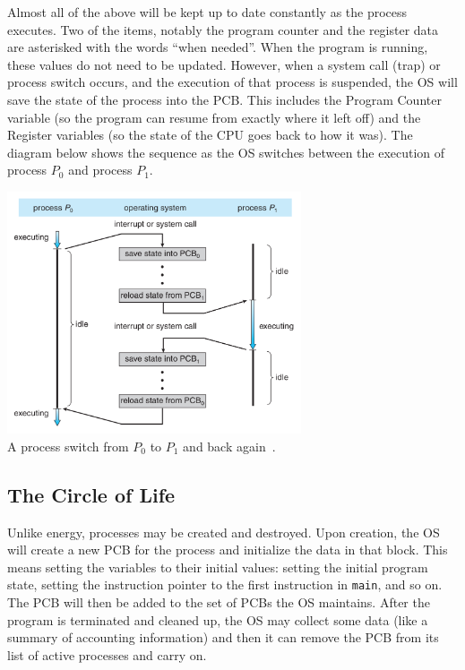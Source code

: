 \documentclass[a4paper]{report}
\begin{document}
Almost all of the above will be kept up to date constantly as the process executes.  Two of the items, notably the program counter and the register data are asterisked with the words ``when needed''. When the program is running, these values do not need to be updated. However, when a system call (trap) or process switch occurs, and the execution of that process is suspended, the OS will save the state of the process into the PCB. This includes the Program Counter variable (so the program can resume from exactly where it left off) and the Register variables (so the state of the CPU goes back to how it was). The diagram below shows the sequence as the OS switches between the execution of process $P_{0}$ and process $P_{1}$.

\begin{center}
	\includegraphics[width=0.65\textwidth]{images/process-switch.png}\\
	A process switch from $P_{0}$ to $P_{1}$ and back again~\cite{osc}.
\end{center}

\subsection*{The Circle of Life}

Unlike energy, processes may be created and destroyed. Upon creation, the OS will create a new PCB for the process and initialize the data in that block. This means setting the variables to their initial values: setting the initial program state, setting the instruction pointer to the first instruction in \texttt{main}, and so on.  The PCB will then be added to the set of PCBs the OS maintains. After the program is terminated and cleaned up, the OS may collect some data (like a summary of accounting information) and then it can remove the PCB from its list of active processes and carry on.
\end{document}
